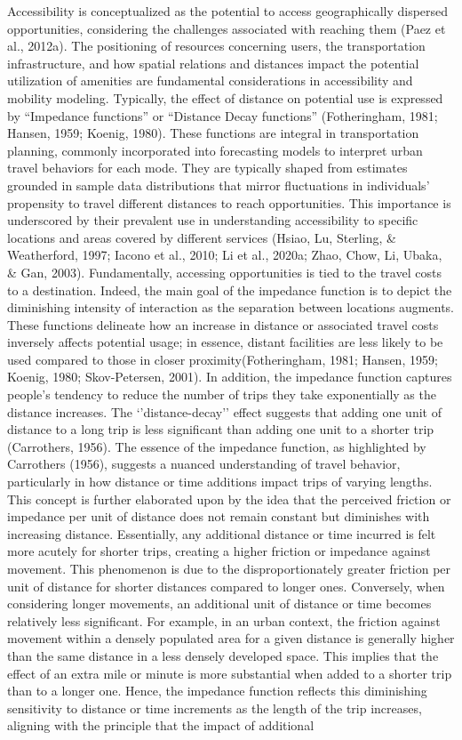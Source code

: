 \documentclass[
11pt, %
oneside, %
english, %
singlespacing, %
]{macthesis} %
\begin{document}
Accessibility is conceptualized as the potential to access geographically dispersed opportunities, considering the challenges associated with reaching them (Paez et al., 2012a). The positioning of resources concerning users, the transportation infrastructure, and how spatial relations and distances impact the potential utilization of amenities are fundamental considerations in accessibility and mobility modeling. Typically, the effect of distance on potential use is expressed by ``Impedance functions'' or ``Distance Decay functions'' (Fotheringham, 1981; Hansen, 1959; Koenig, 1980). These functions are integral in transportation planning, commonly incorporated into forecasting models to interpret urban travel behaviors for each mode. They are typically shaped from estimates grounded in sample data distributions that mirror fluctuations in individuals' propensity to travel different distances to reach opportunities. This importance is underscored by their prevalent use in understanding accessibility to specific locations and areas covered by different services (Hsiao, Lu, Sterling, \& Weatherford, 1997; Iacono et al., 2010; Li et al., 2020a; Zhao, Chow, Li, Ubaka, \& Gan, 2003). Fundamentally, accessing opportunities is tied to the travel costs to a destination. Indeed, the main goal of the impedance function is to depict the diminishing intensity of interaction as the separation between locations augments. These functions delineate how an increase in distance or associated travel costs inversely affects potential usage; in essence, distant facilities are less likely to be used compared to those in closer proximity(Fotheringham, 1981; Hansen, 1959; Koenig, 1980; Skov-Petersen, 2001). In addition, the impedance function captures people's tendency to reduce the number of trips they take exponentially as the distance increases. The `'distance-decay'' effect suggests that adding one unit of distance to a long trip is less significant than adding one unit to a shorter trip (Carrothers, 1956). The essence of the impedance function, as highlighted by Carrothers (1956), suggests a nuanced understanding of travel behavior, particularly in how distance or time additions impact trips of varying lengths. This concept is further elaborated upon by the idea that the perceived friction or impedance per unit of distance does not remain constant but diminishes with increasing distance. Essentially, any additional distance or time incurred is felt more acutely for shorter trips, creating a higher friction or impedance against movement. This phenomenon is due to the disproportionately greater friction per unit of distance for shorter distances compared to longer ones. Conversely, when considering longer movements, an additional unit of distance or time becomes relatively less significant. For example, in an urban context, the friction against movement within a densely populated area for a given distance is generally higher than the same distance in a less densely developed space. This implies that the effect of an extra mile or minute is more substantial when added to a shorter trip than to a longer one. Hence, the impedance function reflects this diminishing sensitivity to distance or time increments as the length of the trip increases, aligning with the principle that the impact of additional 
\end{document}
